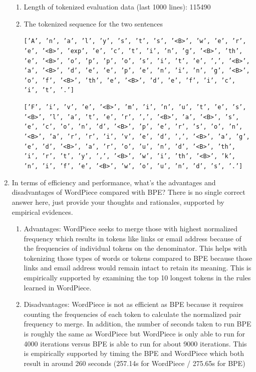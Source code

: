 \documentclass{article}
\newenvironment{solution}{\color{blue}}{}
\begin{document}
\begin{enumerate}
  \begin{solution}
    \begin{enumerate}[1.]
      \item Length of tokenized evaluation data (last 1000 lines): 115490
      \item The tokenized sequence for the two sentences
      
      \texttt{['A', 'n', 'a', 'l', 'y', 's', 't', 's', '<B>', 'w', 'e', 'r', 'e', '<B>', 'exp', 'e', 'c', 't', 'i', 'n', 'g', '<B>', 'th', 'e', '<B>', 'o', 'p', 'p', 'o', 's', 'i', 't', 'e', ',', '<B>', 'a', '<B>', 'd', 'e', 'e', 'p', 'e', 'n', 'i', 'n', 'g', '<B>', 'o', 'f', '<B>', 'th', 'e', '<B>', 'd', 'e', 'f', 'i', 'c', 'i', 't', '.']}

      \texttt{['F', 'i', 'v', 'e', '<B>', 'm', 'i', 'n', 'u', 't', 'e', 's', '<B>', 'l', 'a', 't', 'e', 'r', ',', '<B>', 'a', '<B>', 's', 'e', 'c', 'o', 'n', 'd', '<B>', 'p', 'e', 'r', 's', 'o', 'n', '<B>', 'a', 'r', 'r', 'i', 'v', 'e', 'd', ',', '<B>', 'a', 'g', 'e', 'd', '<B>', 'a', 'r', 'o', 'u', 'n', 'd', '<B>', 'th', 'i', 'r', 't', 'y', ',', '<B>', 'w', 'i', 'th', '<B>', 'k', 'n', 'i', 'f', 'e', '<B>', 'w', 'o', 'u', 'n', 'd', 's', '.']}
    \end{enumerate}
  \end{solution}

  \item In terms of efficiency and performance, what's the advantages and disadvantages 
  of WordPiece compared with BPE? There is no single correct answer here, just 
  provide your thoughts and rationales, supported by empirical evidences.

  \begin{solution}
    \begin{enumerate}
      \item Advantages: WordPiece seeks to merge those with highest normalized frequency
      which results in tokens like links or email address because of the frequencies of 
      individual tokens on the denominator. This helps with tokenizing those types of 
      words or tokens compared to BPE because those links and email address would remain 
      intact to retain its meaning. This is empirically supported by examining the top 10 
      longest tokens in the rules learned in WordPiece.

      \item Disadvantages: WordPiece is not as efficient as BPE because it requires counting 
      the frequencies of each token to calculate the normalized pair frequency to merge.
      In addition, the number of seconds taken to run BPE is roughly the same as WordPiece
      but WordPiece is only able to run for 4000 iterations versus BPE is able to run for 
      about 9000 iterations. This is empirically supported by timing the BPE and WordPiece which 
      both result in around 260 seconds (257.14s for WordPiece / 275.65s for BPE)
    \end{enumerate}
  \end{solution}

\end{enumerate}
\end{document}
